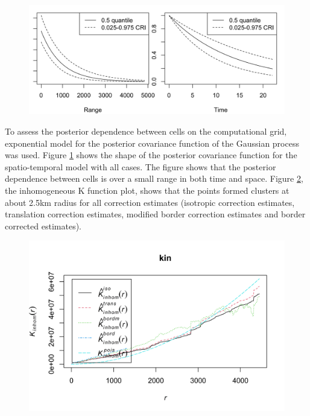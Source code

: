 \begin{figure}[H]
    \begin{center}
        \includegraphics[scale=0.8]{Posterior Covariance Function - All Cases.png}
    \end{center}
     \label{fig:covariance-function-all-cases}
\end{figure}

To assess the posterior dependence between cells on the computational grid,   exponential model for the posterior covariance function of the Gaussian process was used. Figure \ref{fig:covariance-function-all-cases} shows the shape of the posterior covariance function for the spatio-temporal model with all cases. The figure shows that the posterior dependence between cells is over a small range in both time and space. Figure \ref{fig:k-function-all-cases}, the inhomogeneous K function plot, shows that the points formed clusters at about 2.5km radius for all correction estimates (isotropic correction estimates, translation correction estimates, modified border correction estimates and border corrected estimates).

\begin{figure}[H]
    \begin{center}
        \includegraphics[scale=0.75]{Inhomogeneous K Function - All Cases.png}
    \end{center}
     \label{fig:k-function-all-cases}
\end{figure}

